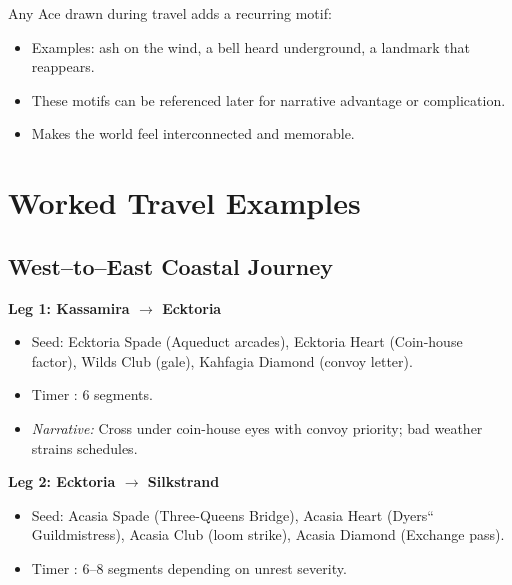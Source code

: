 Any Ace drawn during travel adds a recurring motif:
\begin{itemize}
    \item Examples: ash on the wind, a bell heard underground, a landmark that reappears.
    \item These motifs can be referenced later for narrative advantage or complication.
    \item Makes the world feel interconnected and memorable.
\end{itemize}

\section{Worked Travel Examples}\label{sec:worked_examples}

\subsection{West--to--East Coastal Journey}\label{subsec:coastal_journey}

\textbf{Leg 1: Kassamira $\rightarrow$ Ecktoria}
\begin{itemize}
    \item Seed: Ecktoria Spade (Aqueduct arcades), Ecktoria Heart (Coin-house factor), Wilds Club (gale), Kahfagia Diamond (convoy letter).
    \item Timer : 6 segments.
    \item \textit{Narrative:} Cross under coin-house eyes with convoy priority; bad weather strains schedules.
\end{itemize}

\textbf{Leg 2: Ecktoria $\rightarrow$ Silkstrand}
\begin{itemize}
    \item Seed: Acasia Spade (Three-Queens Bridge), Acasia Heart (Dyers`` Guildmistress), Acasia Club (loom strike), Acasia Diamond (Exchange pass).
    \item Timer : 6--8 segments depending on unrest severity.
\end{itemize}

